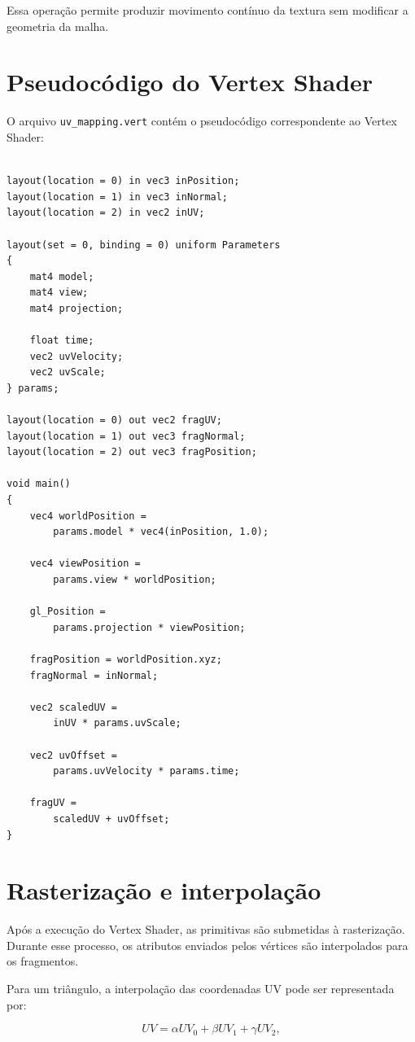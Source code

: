 Essa operação permite produzir movimento contínuo da textura sem modificar
a geometria da malha.

\section{Pseudocódigo do Vertex Shader}

O arquivo \texttt{uv\_mapping.vert} contém o pseudocódigo correspondente ao
Vertex Shader:

\begin{verbatim}

layout(location = 0) in vec3 inPosition;
layout(location = 1) in vec3 inNormal;
layout(location = 2) in vec2 inUV;

layout(set = 0, binding = 0) uniform Parameters
{
    mat4 model;
    mat4 view;
    mat4 projection;

    float time;
    vec2 uvVelocity;
    vec2 uvScale;
} params;

layout(location = 0) out vec2 fragUV;
layout(location = 1) out vec3 fragNormal;
layout(location = 2) out vec3 fragPosition;

void main()
{
    vec4 worldPosition =
        params.model * vec4(inPosition, 1.0);

    vec4 viewPosition =
        params.view * worldPosition;

    gl_Position =
        params.projection * viewPosition;

    fragPosition = worldPosition.xyz;
    fragNormal = inNormal;

    vec2 scaledUV =
        inUV * params.uvScale;

    vec2 uvOffset =
        params.uvVelocity * params.time;

    fragUV =
        scaledUV + uvOffset;
}
\end{verbatim}


\section{Rasterização e interpolação}

Após a execução do Vertex Shader, as primitivas são submetidas à
rasterização. Durante esse processo, os atributos enviados pelos vértices
são interpolados para os fragmentos.

Para um triângulo, a interpolação das coordenadas UV pode ser representada
por:

\begin{equation}
UV=\alpha UV_0+\beta UV_1+\gamma UV_2,
\end{equation}

